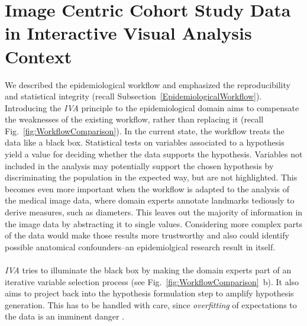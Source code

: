 \documentclass[journal]{style/vgtc} 			          %
\begin{document}
\section{Image Centric Cohort Study Data in Interactive Visual Analysis Context} \label{Image Centric Cohort Study Data in Interactive Visual Analysis Context}
We described the epidemiological workflow and emphasized the reproducibility and statistical integrity (recall Subsection~\ref{EpidemiologicalWorkflow}).
%
%
Introducing the \emph{IVA} principle to the epidemiological domain aims to compensate the weaknesses of the existing workflow, rather than replacing it (recall Fig.~\ref{fig:WorkflowComparison}).
%
In the current state, the workflow treats the data like a black box.
%
Statistical tests on variables associated to a hypothesis yield a value for deciding whether the data supports the hypothesis.
%
Variables not included in the analysis may potentially support the chosen hypothesis by discriminating the population in the expected way, but are not highlighted.
%
This becomes even more important when the workflow is adapted to the analysis of the medical image data, where
domain experts annotate landmarks tediously to derive measures, such as diameters.
%
This leaves out the majority of information in the image data by abstracting it to single values.
%
%
Considering more complex parts of the data would make those results more trustworthy and also could identify possible anatomical confounders--an epidemiolgical research result in itself.
\\\\
\emph{IVA} tries to illuminate the black box by making the domain experts part of an iterative variable selection process (see Fig.~\ref{fig:WorkflowComparison}~b).
%
It also aims to project back into the hypothesis formulation step to amplify hypothesis generation.
%
This has to be handled with care, since \emph{overfitting} of expectations to the data is an imminent danger \cite{Turkay2013}.
\end{document}
